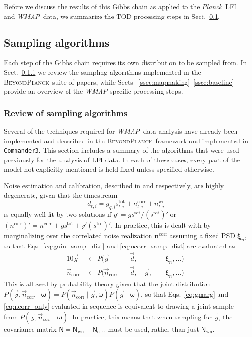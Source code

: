 \documentclass[twocolumn]{../../common/aa}
\def\WMAP{\emph{WMAP}}
\def\Planck{\emph{Planck}}
\def\commanderthree{\texttt{Commander3}}
\newcommand{\g}[0]{\vec{g}}
\newcommand{\bp}{\textsc{BeyondPlanck}}
\newcommand{\ncorr}{\vec n_\mathrm{corr}}
\newcommand{\data}{\vec d}
\begin{document}
Before we discuss the results of this Gibbs chain as applied to the \Planck\ LFI and \WMAP\ data, we summarize the TOD processing steps in Sect.~\ref{sec:algorithms}.



\subsection{Sampling algorithms}
\label{sec:algorithms}

Each step of the Gibbs chain requires its own distribution to be sampled from. In Sect.~\ref{ssec:oldsamplers} we review the sampling algorithms implemented in the \bp\ suite of papers, while Sects.~\ref{ssec:mapmaking}--\ref{ssec:baseline} provide an overview of the \WMAP-specific processing steps.

\subsubsection{Review of sampling algorithms}
\label{ssec:oldsamplers}


Several of the techniques required for \WMAP\ data analysis have already been implemented and described in the \bp\ framework and implemented in \commanderthree. This section includes a summary of the algorithms that were used previously for the analysis of LFI data. In each of these cases, every part of the model not explicitly mentioned is held fixed unless specified otherwise.

Noise estimation and calibration, described in \citet{bp06} and \citet{bp07} respectively, are highly degenerate, given that the timestream
\begin{equation}
	d_{t,i}=g_{q,i}s_{t,i}^\mathrm{tot}+n_{t,i}^\mathrm{corr}+n_{t,i}^\mathrm{wn}
\end{equation}
is equally well fit by two solutions if $g'=gs^\mathrm{tot}/(s^\mathrm{tot})'$ or ${(n^\mathrm{corr})'=n^\mathrm{corr}+gs^\mathrm{tot}+g'(s^\mathrm{tot})'}$. In practice, this is dealt with by marginalizing over the correlated noise realization $\boldsymbol n^\mathrm{corr}$ assuming a fixed PSD $\boldsymbol\xi_n$, so that Eqs.~\eqref{eq:gain_samp_dist} and \eqref{eq:ncorr_samp_dist} are evaluated as
\begin{alignat}{10}
	\g&\,\leftarrow P(\g&\,\mid\data, &\, &\,&\,\boldsymbol\xi_n,\ldots)
	\label{eq:gmarg}
	\\
	\ncorr&\,\leftarrow P(\ncorr&\,\mid\data, &\,\g, &\,&\,\boldsymbol\xi_n,\ldots).
	\label{eq:ncorr_only}
\end{alignat}
This is allowed by probability theory given that the joint distribution $P(\g,\ncorr\mid\boldsymbol\omega)=P(\ncorr\mid\g,\boldsymbol\omega)P(\g\mid\boldsymbol\omega)$, so that Eqs.~\eqref{eq:gmarg} and \eqref{eq:ncorr_only} evaluated in sequence is equivalent to drawing a joint sample from $P(\g,\ncorr\mid\boldsymbol\omega)$. In practice, this means that when sampling for $\g$, the covariance matrix $\mathsf N=\mathsf N_\textrm{wn}+\mathsf N_\textrm{corr}$ must be used, rather than just $\mathsf N_\mathrm{wn}$.
\end{document}
